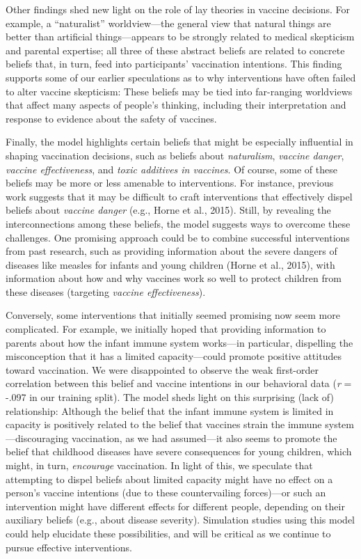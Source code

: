 \documentclass[10pt, letterpaper]{article}
\begin{document}
Other findings shed new light on the role of lay theories in vaccine
decisions. For example, a ``naturalist'' worldview---the general view
that natural things are better than artificial things---appears to be
strongly related to medical skepticism and parental expertise; all three
of these abstract beliefs are related to concrete beliefs that, in turn,
feed into participants' vaccination intentions. This finding supports
some of our earlier speculations as to why interventions have often
failed to alter vaccine skepticism: These beliefs may be tied into
far-ranging worldviews that affect many aspects of people's thinking,
including their interpretation and response to evidence about the safety
of vaccines.

Finally, the model highlights certain beliefs that might be especially
influential in shaping vaccination decisions, such as beliefs about
\emph{naturalism}, \emph{vaccine danger}, \emph{vaccine effectiveness},
and \emph{toxic additives in vaccines}. Of course, some of these beliefs
may be more or less amenable to interventions. For instance, previous
work suggests that it may be difficult to craft interventions that
effectively dispel beliefs about \emph{vaccine danger} (e.g., Horne et
al., 2015). Still, by revealing the interconnections among these
beliefs, the model suggests ways to overcome these challenges. One
promising approach could be to combine successful interventions from
past research, such as providing information about the severe dangers of
diseases like measles for infants and young children (Horne et al.,
2015), with information about how and why vaccines work so well to
protect children from these diseases (targeting \emph{vaccine
effectiveness}).

Conversely, some interventions that initially seemed promising now seem
more complicated. For example, we initially hoped that providing
information to parents about how the infant immune system works---in
particular, dispelling the misconception that it has a limited
capacity---could promote positive attitudes toward vaccination. We were
disappointed to observe the weak first-order correlation between this
belief and vaccine intentions in our behavioral data (\emph{r} = -.097
in our training split). The model sheds light on this surprising (lack
of) relationship: Although the belief that the infant immune system is
limited in capacity is positively related to the belief that vaccines
strain the immune system---discouraging vaccination, as we had
assumed---it also seems to promote the belief that childhood diseases
have severe consequences for young children, which might, in turn,
\emph{encourage} vaccination. In light of this, we speculate that
attempting to dispel beliefs about limited capacity might have no effect
on a person's vaccine intentions (due to these countervailing
forces)---or such an intervention might have different effects for
different people, depending on their auxiliary beliefs (e.g., about
disease severity). Simulation studies using this model could help
elucidate these possibilities, and will be critical as we continue to
pursue effective interventions.
\end{document}
